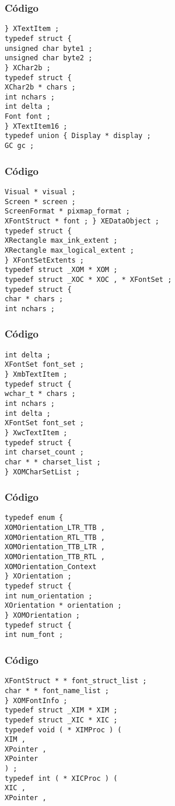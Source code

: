 \documentclass{beamer}
\begin{document}
\begin{frame}[fragile]
\frametitle{C\'odigo}
\begin{verbatim}
} XTextItem ; 
typedef struct { 
unsigned char byte1 ; 
unsigned char byte2 ; 
} XChar2b ; 
typedef struct { 
XChar2b * chars ; 
int nchars ; 
int delta ; 
Font font ; 
} XTextItem16 ; 
typedef union { Display * display ; 
GC gc ; 
\end{verbatim}
\end{frame}
\begin{frame}[fragile]
\frametitle{C\'odigo}
\begin{verbatim}
Visual * visual ; 
Screen * screen ; 
ScreenFormat * pixmap_format ; 
XFontStruct * font ; } XEDataObject ; 
typedef struct { 
XRectangle max_ink_extent ; 
XRectangle max_logical_extent ; 
} XFontSetExtents ; 
typedef struct _XOM * XOM ; 
typedef struct _XOC * XOC , * XFontSet ; 
typedef struct { 
char * chars ; 
int nchars ; 
\end{verbatim}
\end{frame}
\begin{frame}[fragile]
\frametitle{C\'odigo}
\begin{verbatim}
int delta ; 
XFontSet font_set ; 
} XmbTextItem ; 
typedef struct { 
wchar_t * chars ; 
int nchars ; 
int delta ; 
XFontSet font_set ; 
} XwcTextItem ; 
typedef struct { 
int charset_count ; 
char * * charset_list ; 
} XOMCharSetList ; 
\end{verbatim}
\end{frame}
\begin{frame}[fragile]
\frametitle{C\'odigo}
\begin{verbatim}
typedef enum { 
XOMOrientation_LTR_TTB , 
XOMOrientation_RTL_TTB , 
XOMOrientation_TTB_LTR , 
XOMOrientation_TTB_RTL , 
XOMOrientation_Context 
} XOrientation ; 
typedef struct { 
int num_orientation ; 
XOrientation * orientation ; 
} XOMOrientation ; 
typedef struct { 
int num_font ; 
\end{verbatim}
\end{frame}
\begin{frame}[fragile]
\frametitle{C\'odigo}
\begin{verbatim}
XFontStruct * * font_struct_list ; 
char * * font_name_list ; 
} XOMFontInfo ; 
typedef struct _XIM * XIM ; 
typedef struct _XIC * XIC ; 
typedef void ( * XIMProc ) ( 
XIM , 
XPointer , 
XPointer 
) ; 
typedef int ( * XICProc ) ( 
XIC , 
XPointer , 
\end{verbatim}
\end{frame}
\end{document}
